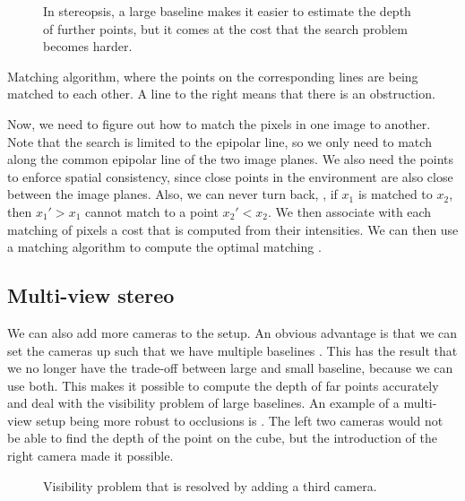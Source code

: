 \begin{figure}[t]
    \centering
    \caption{In stereopsis, a large baseline makes it easier to estimate the
        depth of further points, but it comes at the cost that the search problem
        becomes harder.}
    \label{fig:stereo-baseline}
\end{figure}

\begin{marginfigure}
    \centering
    \caption{Matching algorithm, where the points on the corresponding lines are
        being matched to each other. A line to the right means that there is an
        obstruction.}
    \label{fig:matching-algorithm}
\end{marginfigure}

Now, we need to figure out how to match the pixels in one image to another.
Note that the search is limited to the epipolar line, so we only need to match
along the common epipolar line of the two image planes. We also need the points
to enforce spatial consistency, since close points in the environment are also
close between the image planes. Also, we can never turn back, \ie, if $x_1$ is
matched to $x_2$, then $x_1' > x_1$ cannot match to a point $x_2' < x_2$. We
then associate with each matching of pixels a cost that is computed from their
intensities. We can then use a matching algorithm to compute the optimal
matching \citep{baker1981depth}.

\subsection{Multi-view stereo}

We can also add more cameras to the setup. An obvious advantage is that we can
set the cameras up such that we have multiple baselines
\citep{okutomi1993multiple}. This has the result that we no longer have the
trade-off between large and small baseline, because we can use both. This makes
it possible to compute the depth of far points accurately and deal with the
visibility problem of large baselines. An example of a multi-view setup being
more robust to occlusions is . The left two
cameras would not be able to find the depth of the point on the cube, but the
introduction of the right camera made it possible.

\begin{figure}
    \centering
    \caption{Visibility problem that is resolved by adding a third camera.}
    \label{fig:visibility-problem}
\end{figure}

